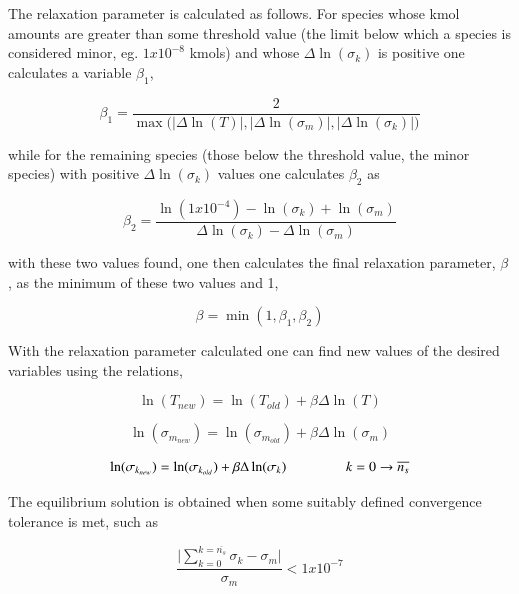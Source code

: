 	The relaxation parameter is calculated as follows.  For species whose kmol amounts are
greater than some threshold value (the limit below which a species is considered minor, eg. $1 x 10^{-8}$
kmols) and whose $\Delta \ln(\sigma_k)$ is positive one calculates a variable $\beta_1$,

\begin{equation}
	\beta_1=\frac{2}{\max\Big(\vert\Delta \ln(T)\vert, \vert\Delta \ln(\sigma_m)\vert, 
	\vert\Delta \ln(\sigma_k)\vert\Big)}
\label{eqn:beta1}
\end{equation}

	while for the remaining species (those below the threshold value, the minor species) with positive
$\Delta \ln(\sigma_k)$ values one calculates $\beta_2$ as

\begin{equation}
	\beta_2=\frac{\ln(1 x 10^{-4}) - \ln(\sigma_k) + \ln(\sigma_m)}{\Delta \ln(\sigma_k) - \Delta \ln(\sigma_m)}
\label{eqn:beta2}
\end{equation}

	with these two values found, one then calculates the final relaxation parameter, $\beta$, as
the minimum of these two values and 1,

\begin{equation}
	\beta= \min(1,\beta_1, \beta_2)
\label{eqn:beta}
\end{equation}

	With the relaxation parameter calculated one can find new values of the desired variables
using the relations,

\begin{displaymath}
	\ln(T_{new}) = \ln(T_{old}) + \beta \Delta \ln(T)
\end{displaymath}

\begin{displaymath}
	\ln(\sigma_{m_{new}}) = \ln(\sigma_{m_{old}}) + \beta \Delta \ln(\sigma_m)
\end{displaymath}

\begin{displaymath}
	\ln(\sigma_{k_{new}}) = \ln(\sigma_{k_{old}}) + \beta \Delta \ln(\sigma_k)
	\hspace{15mm}k=0 \rightarrow \overline{n_s}
\end{displaymath}

	The equilibrium solution is obtained when some suitably defined convergence tolerance is
met, such as 

\begin{equation}
	\frac{\vert\sum_{k=0}^{k=\overline{n_s}}\sigma_k - \sigma_m\vert}{\sigma_m} < 1 x 10^{-7}
\label{eqn:converge}
\end{equation}

